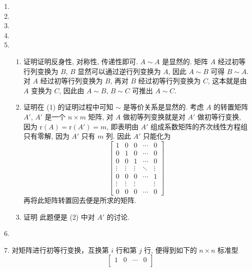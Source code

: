 \documentclass[a4paper, 11pt]{ctexart}
\newcommand{\rank}{\mathrm{r}}
\begin{document}
\begin{enumerate}
    \item %
    \item %
    \item %
    \item %
    \item %
        \begin{enumerate}[(1)]
            \item %
                {\heiti 证明}\quad 证明反身性, 对称性, 传递性即可. $A \sim A$ 是显然的.
                矩阵 $A$ 经过初等行列变换为 $B$, $B$ 显然可以通过逆行列变换为 $A$, 因此 $A \sim B$ 可得 $B \sim A$.
                对 $A$ 经过初等行列变换为 $B$, 再对 $B$ 经过初等行列变换为 $C$, 这本就是由 $A$ 变换为 $C$, 因此由 $A \sim B$, $B \sim C$ 可推出 $A \sim C$.
            \item %
                {\heiti 证明}\quad 在 (1) 的证明过程中可知 $\sim$ 是等价关系是显然的.
                考虑 $A$ 的转置矩阵 $A'$, $A'$ 是一个 $n \times m$ 矩阵, 对 $A$ 做初等列变换就是对 $A'$ 做初等行变换, 因为 $\rank(A) = \rank(A') = m$, 即表明由 $A'$ 组成系数矩阵的齐次线性方程组只有零解, 因为 $A'$ 只有 $m$ 列.
                因此 $A'$ 只能化为
                \[
                    \begin{bmatrix}
                        1 & 0 & 0 & \cdots & 0 \\
                        0 & 1 & 0 & \cdots & 0 \\
                        0 & 0 & 1 & \cdots & 0 \\
                        \vdots & \vdots & \vdots & \ddots & \vdots \\
                        0 & 0 & 0 & \cdots & 1 \\
                        \vdots & \vdots & \vdots &  & \vdots \\
                        0 & 0 & 0 & \cdots & 0
                    \end{bmatrix}    
                \]
                再将此矩阵转置回去便是所求的矩阵.
            \item %
                {\heiti 证明} 此题便是 (2) 中对 $A'$ 的讨论.
        \end{enumerate}
    \item %
    \item %
        对矩阵进行初等行变换，互换第 $i$ 行和第 $j$ 行, 便得到如下的 $n \times n$ 标准型
        \[
            \begin{bmatrix}
                1 & 0 & \cdots & 0 \\

\end{bmatrix}\]
\end{enumerate}
\end{document}
